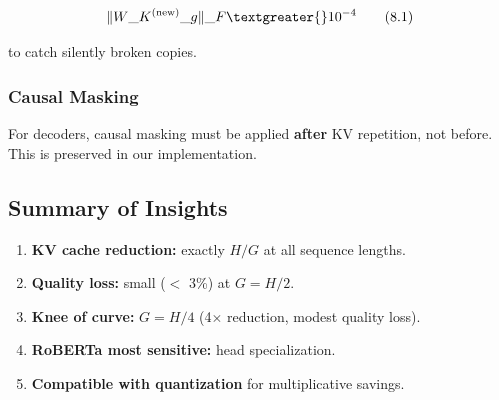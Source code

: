 \[
\|W\_K^{(\text{new})}\_g\|\_F \textgreater{} 10^{-4}
\tag{8.1}
\]

to catch silently broken copies.

\subsubsection{Causal Masking}

For decoders, causal masking must be applied \textbf{after} KV repetition, not 
before. This is preserved in our implementation.

\subsection{Summary of Insights}

\begin{enumerate}
\item \textbf{KV cache reduction:} exactly $H / G$ at all sequence lengths.
\item \textbf{Quality loss:} small ($<$ 3\%) at $G = H/2$.
\item \textbf{Knee of curve:} $G = H/4$ (4$\times$ reduction, modest quality loss).
\item \textbf{RoBERTa most sensitive:} head specialization.
\item \textbf{Compatible with quantization} for multiplicative savings.
\end{enumerate}